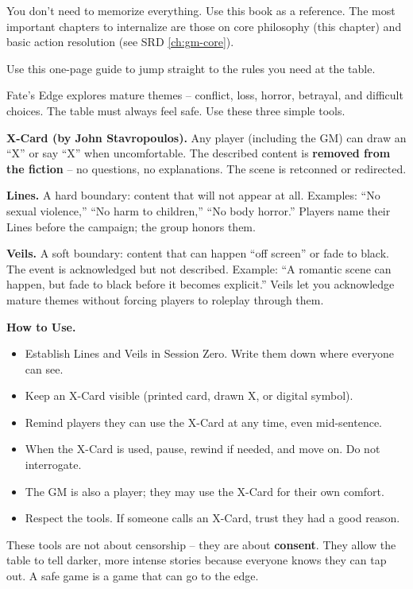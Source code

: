 You don't need to memorize everything. Use this book as a reference. The most important chapters to internalize are those on core philosophy (this chapter) and basic action resolution (see SRD \ref{ch:gm-core}).

\begin{tcolorbox}[enhanced, sharp corners, boxrule=1pt, colback=gray!5!white, colframe=gray!75!black, title={Quick Reference: Where to Find It},breakable]
Use this one-page guide to jump straight to the rules you need at the table.
\end{tcolorbox}

\begin{tcolorbox}[enhanced, sharp corners, boxrule=1pt, colback=gray!5!white, colframe=gray!75!black, title={Safety Tools: Lines, Veils \& X-Card},breakable]
Fate's Edge explores mature themes -- conflict, loss, horror, betrayal, and difficult choices. The table must always feel safe. Use these three simple tools.

\bigskip
\noindent\textbf{X-Card (by John Stavropoulos).} Any player (including the GM) can draw an ``X'' or say ``X'' when uncomfortable. The described content is \textbf{removed from the fiction} -- no questions, no explanations. The scene is retconned or redirected.

\bigskip
\noindent\textbf{Lines.} A hard boundary: content that will not appear at all. Examples: ``No sexual violence,'' ``No harm to children,'' ``No body horror.'' Players name their Lines before the campaign; the group honors them.

\bigskip
\noindent\textbf{Veils.} A soft boundary: content that can happen ``off screen'' or fade to black. The event is acknowledged but not described. Example: ``A romantic scene can happen, but fade to black before it becomes explicit.'' Veils let you acknowledge mature themes without forcing players to roleplay through them.

\bigskip
\noindent\textbf{How to Use.}
\begin{itemize}
  \item Establish Lines and Veils in Session Zero. Write them down where everyone can see.
  \item Keep an X-Card visible (printed card, drawn X, or digital symbol).
  \item Remind players they can use the X-Card at any time, even mid-sentence.
  \item When the X-Card is used, pause, rewind if needed, and move on. Do not interrogate.
  \item The GM is also a player; they may use the X-Card for their own comfort.
  \item Respect the tools. If someone calls an X-Card, trust they had a good reason.
\end{itemize}

These tools are not about censorship -- they are about \textbf{consent}. They allow the table to tell darker, more intense stories because everyone knows they can tap out. A safe game is a game that can go to the edge.
\end{tcolorbox}

